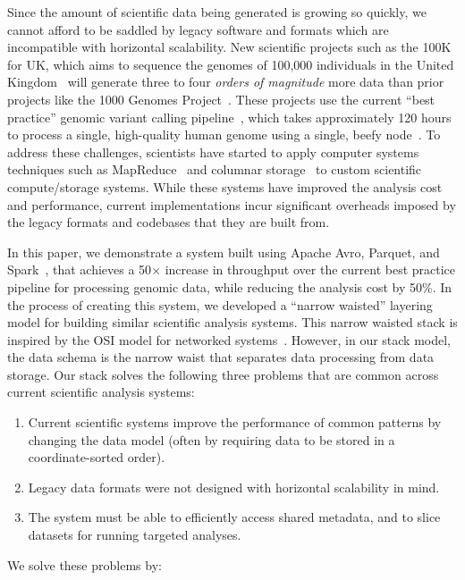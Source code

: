 \documentclass{acm_proc_article-sp}
\begin{document}
Since the amount of scientific data being generated is growing so quickly, we cannot afford to be
saddled by legacy software and formats which are incompatible with horizontal scalability. New scientific
projects such as the 100K for UK, which aims to sequence the genomes of 100,000 individuals in the
United Kingdom~\cite{uk100k} will generate three to four \emph{orders of magnitude} more data than
prior projects like the 1000 Genomes Project~\cite{siva08}. These projects use the current ``best
practice'' genomic variant calling pipeline~\cite{auwera13}, which takes approximately 120 hours to
process a single, high-quality human genome using a single, beefy node~\cite{talwalkar14}. To address
these challenges, scientists have started to apply computer systems techniques such as
MapReduce~\cite{mckenna10, schatz09, langmead09} and columnar storage~\cite{fritz11} to custom
scientific compute/storage systems. While these systems have improved the analysis cost and
performance, current implementations incur significant overheads imposed by the legacy formats and
codebases that they are built from.

In this paper, we demonstrate a system built using Apache Avro, Parquet, and Spark~\cite{avro, parquet,
zaharia10}, that achieves a 50$\times$ increase in throughput over the current best practice pipeline
for processing genomic data, while reducing the analysis cost by 50\%. In the process of creating this
system, we developed a ``narrow waisted'' layering model for building similar scientific analysis systems.
This narrow waisted stack is inspired by the OSI model for networked systems~\cite{zimmermann80}.
However, in our stack model, the data schema is the narrow waist that separates data processing from
data storage. Our stack solves the following three problems that are common across current scientific
analysis systems:

\begin{enumerate}
\item Current scientific systems improve the performance of common patterns by changing the data
model (often by requiring data to be stored in a coordinate-sorted order).
\item Legacy data formats were not designed with horizontal scalability in mind.
\item The system must be able to efficiently access shared metadata, and to slice datasets for running
targeted analyses.
\end{enumerate}

We solve these problems by:
\end{document}
